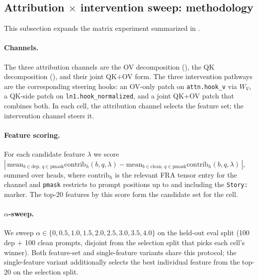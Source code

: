 \documentclass{article}
\theoremstyle{plain}
\theoremstyle{definition}
\theoremstyle{remark}
\newcommand{\WV}{W_V}
\begin{document}
\subsection{Attribution $\times$ intervention sweep: methodology}
\label{app:sleeper_method}

This subsection expands the matrix experiment summarized in .

\paragraph{Channels.} The three attribution channels are the OV decomposition (), the QK decomposition (), and their joint QK${+}$OV form. The three intervention pathways are the corresponding steering hooks: an OV-only patch on \texttt{attn.hook\_v} via $\WV$, a QK-side patch on \texttt{ln1.hook\_normalized}, and a joint QK${+}$OV patch that combines both. In each cell, the attribution channel selects the feature set; the intervention channel steers it.

\paragraph{Feature scoring.} For each candidate feature $\lambda$ we score $|\,\mathrm{mean}_{b \in \text{dep},\, q \in \text{pmask}} \mathrm{contrib}_h(b, q, \lambda) - \mathrm{mean}_{b \in \text{clean},\, q \in \text{pmask}} \mathrm{contrib}_h(b, q, \lambda)\,|$, summed over heads, where $\mathrm{contrib}_h$ is the relevant FRA tensor entry for the channel and \texttt{pmask} restricts to prompt positions up to and including the \texttt{Story:} marker. The top-20 features by this score form the candidate set for the cell.

\paragraph{$\alpha$-sweep.} We sweep $\alpha \in \{0, 0.5, 1.0, 1.5, 2.0, 2.5, 3.0, 3.5, 4.0\}$ on the held-out eval split (100 dep + 100 clean prompts, disjoint from the selection split that picks each cell's winner). Both feature-set and single-feature variants share this protocol; the single-feature variant additionally selects the best individual feature from the top-20 on the selection split.
\end{document}
